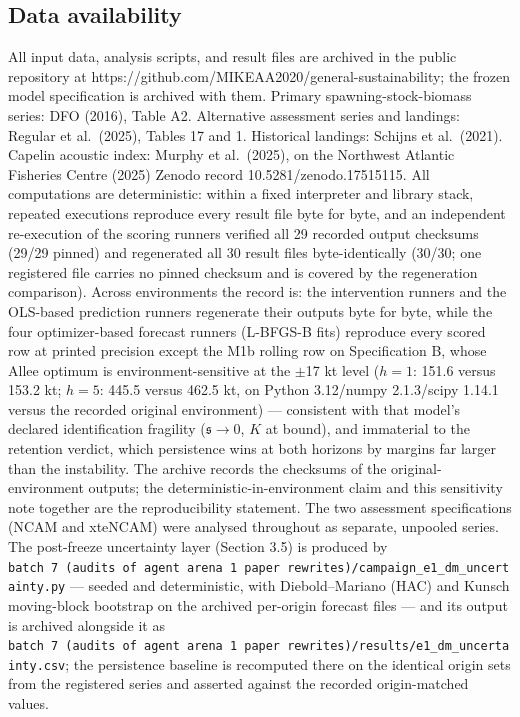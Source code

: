 \documentclass[11pt]{article}
\begin{document}
\subsection{Data availability}\label{data-availability}

All input data, analysis scripts, and result files are archived in the
public repository at
https://github.com/MIKEAA2020/general-sustainability; the frozen model
specification is archived with them. Primary spawning-stock-biomass
series: DFO (2016), Table A2. Alternative assessment series and
landings: Regular et al.~(2025), Tables 17 and 1. Historical landings:
Schijns et al.~(2021). Capelin acoustic index: Murphy et al.~(2025), on
the Northwest Atlantic Fisheries Centre (2025) Zenodo record
10.5281/zenodo.17515115. All computations are deterministic: within a
fixed interpreter and library stack, repeated executions reproduce every
result file byte for byte, and an independent re-execution of the
scoring runners verified all 29 recorded output checksums (29/29 pinned)
and regenerated all 30 result files byte-identically (30/30; one
registered file carries no pinned checksum and is covered by the
regeneration comparison). Across environments the record is: the
intervention runners and the OLS-based prediction runners regenerate
their outputs byte for byte, while the four optimizer-based forecast
runners (L-BFGS-B fits) reproduce every scored row at printed precision
except the M1b rolling row on Specification B, whose Allee optimum is
environment-sensitive at the \ensuremath{\pm}17 kt level (\(h=1\): 151.6 versus 153.2
kt; \(h=5\): 445.5 versus 462.5 kt, on Python 3.12/numpy 2.1.3/scipy
1.14.1 versus the recorded original environment) --- consistent with
that model's declared identification fragility (\(\mathfrak s\to 0\),
\(K\) at bound), and immaterial to the retention verdict, which
persistence wins at both horizons by margins far larger than the
instability. The archive records the checksums of the
original-environment outputs; the deterministic-in-environment claim and
this sensitivity note together are the reproducibility statement. The
two assessment specifications (NCAM and xteNCAM) were analysed
throughout as separate, unpooled series. The post-freeze uncertainty
layer (Section 3.5) is produced by
\texttt{batch\ 7\ (audits\ of\ agent\ arena\ 1\ paper\ rewrites)/campaign\_e1\_dm\_uncertainty.py}
--- seeded and deterministic, with Diebold--Mariano (HAC) and Kunsch
moving-block bootstrap on the archived per-origin forecast files --- and
its output is archived alongside it as
\texttt{batch\ 7\ (audits\ of\ agent\ arena\ 1\ paper\ rewrites)/results/e1\_dm\_uncertainty.csv};
the persistence baseline is recomputed there on the identical origin
sets from the registered series and asserted against the recorded
origin-matched values.
\end{document}
